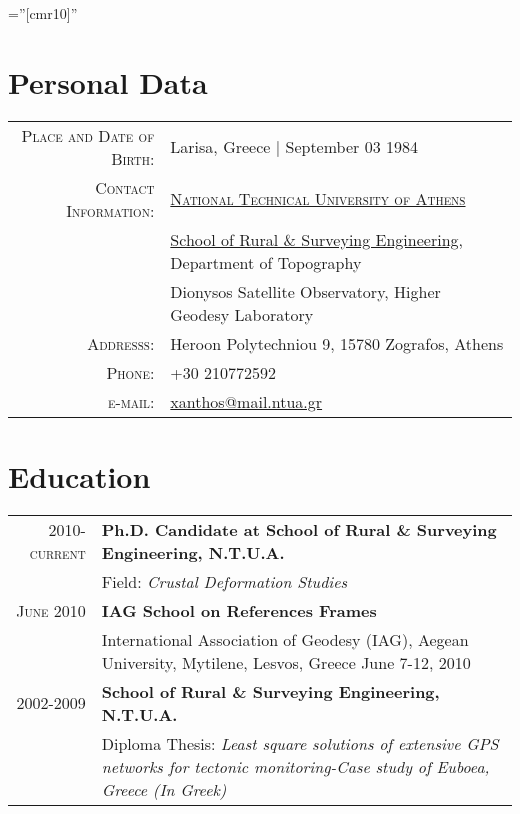 \documentclass[a4paper,10pt]{article} %
\begin{document}
\pagestyle{empty} %
\font\fb=''[cmr10]'' %

\par{\bigskip\par} %

\section{Personal Data}

\begin{tabular}{rl}
  \textsc{Place and Date of Birth:} & Larisa, Greece | September 03 1984\\
  \textsc{Contact Information:}
  & \textsc{\href{http://www.ntua.gr/}{National Technical University of Athens}} \\
  & \href{http://www.survey.ntua.gr/}{School of Rural \& Surveying Engineering}, Department of Topography\\
  & Dionysos Satellite Observatory, Higher Geodesy Laboratory \\
  \textsc{Addresss:} & Heroon Polytechniou 9, 15780 Zografos, Athens\\
  \textsc{Phone:} & +30 210772592\\
  \textsc{e-mail:} & \href{mailto:xanthos@mail.ntua.gr}{xanthos@mail.ntua.gr}
\end{tabular}
\medskip

\section{Education}
\begin{tabular}{rp{13cm}}

  \textsc{2010-current} &\textbf{Ph.D. Candidate at School of Rural \& Surveying Engineering, N.T.U.A.}\\
   & Field: \textit{Crustal Deformation Studies}\\

  \textsc{June 2010} & \textbf{IAG School on References Frames}\\
    & International Association of Geodesy \small{(IAG)}, Aegean University, Mytilene, Lesvos, Greece June 7-12, 2010\\

  \textsc{2002-2009} & \textbf{School of Rural \& Surveying Engineering, N.T.U.A.}\\
  & Diploma Thesis: 
  \textit{Least square solutions of extensive GPS networks for tectonic monitoring-Case study of Euboea, Greece (In Greek)}\\

\end{tabular}
\medskip
\end{document}
